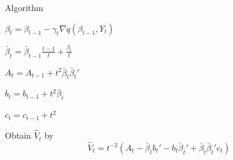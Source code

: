 \documentclass[beamer, t]{beamer}
\begin{document}
\begin{frame}{Algorithm}

\begin{algorithm}[H]
\footnotesize


  {
    $\beta_{t}=\beta_{t-1}-\gamma_{t}\nabla q\left(\beta_{t-1},Y_{t}\right)$

    $\bar{\beta}_{t}=\bar{\beta}_{t-1}\frac{t-1}{t}+\frac{\beta_{t}}{t}$

    $A_{t} = A_{t-1} + t^{2}\bar{\beta}_{t}\bar{\beta}_{t}'$

    $b_{t} = b_{t-1} + t^{2}\bar{\beta}_{t}$
    
    $c_t =c_{t-1} + t^2$

    Obtain $\widehat{V}_{t}$ by
      \[
      \widehat{V}_{t}
      = t^{-2} \left( A_t - \bar{\beta}_{t} b_{t}' - b_{t}\bar{\beta}_{t}' +\bar{\beta}_{t}\bar{\beta}_{t}'c_t \right)
      \]

 }
\end{algorithm}

\end{frame}
\end{document}
